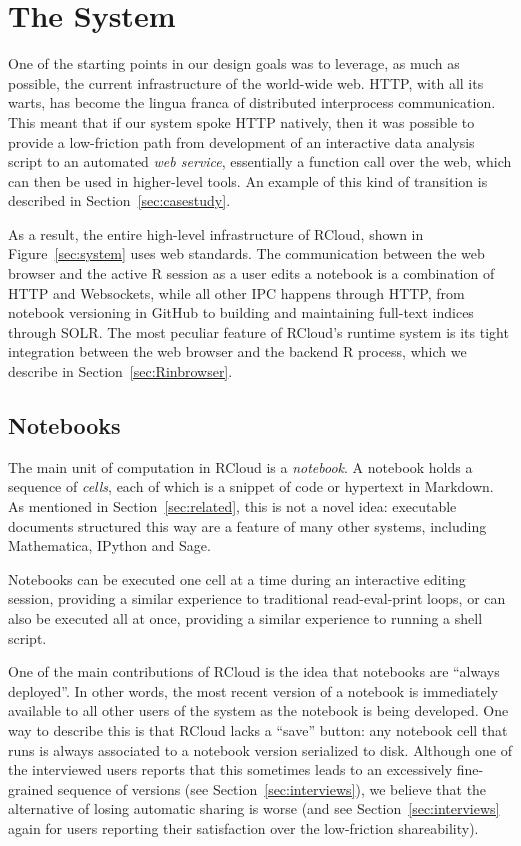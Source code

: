 \section{The System\label{sec:system}}

One of the starting points in our design goals was to leverage, as
much as possible, the current infrastructure of the world-wide
web. HTTP, with all its warts, has become the lingua franca of
distributed interprocess communication. This meant that if our system
spoke HTTP natively, then it was possible to provide a low-friction
path from development of an interactive data analysis script to an
automated \emph{web service}, essentially a function call over the
web, which can then be used in higher-level tools. An example of this
kind of transition is described in Section~\ref{sec:casestudy}.

As a result, the entire high-level infrastructure of RCloud, shown in
Figure~\ref{sec:system} uses web standards. The communication between
the web browser and the active R session as a user edits a notebook is
a combination of HTTP and Websockets, while all other IPC happens
through HTTP, from notebook versioning in GitHub to building and
maintaining full-text indices through SOLR. The most peculiar feature of RCloud's runtime system is its tight integration between the web browser and the backend R process, which we describe in Section~\ref{sec:Rinbrowser}.

\subsection{Notebooks\label{sec:notebooks}}

The main unit of computation in RCloud is a \emph{notebook}.  A
notebook holds a sequence of \emph{cells}, each of which is a snippet
of code or hypertext in Markdown. As mentioned in
Section~\ref{sec:related}, this is not a novel idea: executable
documents structured this way are a feature of many other systems,
including Mathematica, IPython and Sage.

Notebooks can be executed one cell at a time during an interactive
editing session, providing a similar experience to traditional
read-eval-print loops, or can also be executed all at once, providing
a similar experience to running a shell script.

One of the main contributions of RCloud is the idea that notebooks are
``always deployed''. In other words, the most recent version of a
notebook is immediately available to all other users of the system as
the notebook is being developed. One way to describe this is that
RCloud lacks a ``save'' button: any notebook cell that runs is always
associated to a notebook version serialized to disk. Although one of
the interviewed users reports that this sometimes leads to an
excessively fine-grained sequence of versions (see
Section~\ref{sec:interviews}), we believe that the alternative of
losing automatic sharing is worse (and see
Section~\ref{sec:interviews} again for users reporting their
satisfaction over the low-friction shareability).

